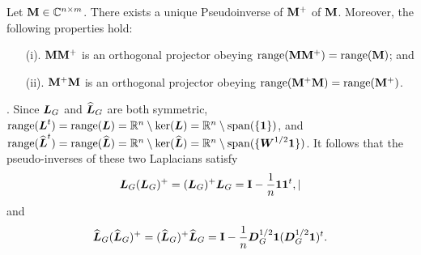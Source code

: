 \begin{lemma}
Let $\vb{M}\in \mathbb{C}^{n\times m}$. There exists a unique Pseudoinverse of $\vb{M}^+$ of $\vb{M}$. Moreover, the following properties hold: 
\begin{enumerate}
    \item[(i).] $\vb{M}\vb{M}^+$ is an orthogonal projector obeying $\textnormal{range}(\vb{M}\vb{M}^+)=\textnormal{range}(\vb{M})$; and 
    \item[(ii).] $\vb{M}^+\vb{M}$ is an orthogonal projector obeying $\textnormal{range}(\vb{M}^+\vb{M})=\textnormal{range}(\vb{M}^+)$. 
\end{enumerate}
\end{lemma}

. 
Since $\vb*{L}_G$ and $\widehat{\vb*{L}}_G$ are both symmetric, $\textnormal{range}(\vb*{L}^t)=\textnormal{range}(\vb*{L})=\mathbb{R}^n \setminus \ker(\vb*{L})=\mathbb{R}^n \setminus \textnormal{span}(\{\vb{1}\})$, and $\textnormal{range}(\widehat{\vb*{L}}^t)=\textnormal{range}(\widehat{\vb*{L}})=\mathbb{R}^n \setminus \ker(\widehat{\vb*{L}})=\mathbb{R}^n \setminus \textnormal{span}(\{\vb*{W}^{1/2}\vb{1}\})$. It follows that the pseudo-inverses of these two Laplacians satisfy
\begin{equation}
    \vb*{L}_G(\vb*{L}_G)^+ = (\vb*{L}_G)^+\vb*{L}_G = \vb{I} - \frac{1}{n}\vb{1}\vb{1}^t,\label{eq:LL+}|
\end{equation}
and 
\begin{equation*}
    \widehat{\vb*{L}}_G(\widehat{\vb*{L}}_G)^+ = (\widehat{\vb*{L}}_G)^+\widehat{\vb*{L}}_G = \vb{I} - \frac{1}{n}\vb*{D}_G^{1/2}\vb{1}(\vb*{D}_G^{1/2}\vb{1})^t.
\end{equation*}

